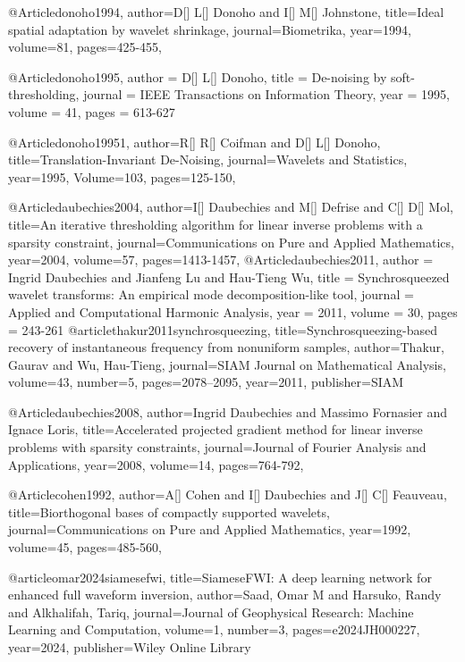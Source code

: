@Article{donoho1994,
  author={D[] L[] Donoho and I[] M[] Johnstone},
  title={Ideal spatial adaptation by wavelet shrinkage},
  journal={Biometrika},
  year=1994,
  volume=81,
  pages={425-455},
}

@Article{donoho1995,
  author =  {D[] L[] Donoho},
  title =   {De-noising by soft-thresholding},
  journal = {IEEE Transactions on Information Theory},
  year =    {1995},
  volume =  {41},
  pages =   {613-627}
}


@Article{donoho19951,
  author={R[] R[] Coifman and D[] L[] Donoho},
  title={Translation-Invariant De-Noising},
  journal={Wavelets and Statistics},
  year=1995,
  Volume=103,
  pages={125-150},
}

@Article{daubechies2004,
  author={I[] Daubechies and M[] Defrise and C[] D[] Mol},
  title={An iterative thresholding algorithm for linear inverse problems with a sparsity constraint},
  journal={Communications on Pure and Applied Mathematics},
  year=2004,
  volume=57,
  pages={1413-1457},
}
@Article{daubechies2011,
  author = 	 {Ingrid Daubechies and Jianfeng Lu and Hau-Tieng Wu},
  title = 	 {Synchrosqueezed wavelet transforms: An empirical mode decomposition-like tool},
  journal = 	 {Applied and Computational Harmonic Analysis},
  year = 	 2011,
  volume = 	 30,
  pages = 	 {243-261}
}
@article{thakur2011synchrosqueezing,
  title={Synchrosqueezing-based recovery of instantaneous frequency from nonuniform samples},
  author={Thakur, Gaurav and Wu, Hau-Tieng},
  journal={SIAM Journal on Mathematical Analysis},
  volume={43},
  number={5},
  pages={2078--2095},
  year={2011},
  publisher={SIAM}
}


@Article{daubechies2008,
  author={Ingrid Daubechies and Massimo Fornasier and Ignace Loris},
  title={Accelerated projected gradient method for linear inverse problems with sparsity constraints},
  journal={Journal of {F}ourier Analysis and Applications},
  year=2008,
  volume=14,
  pages={764-792},
}

@Article{cohen1992,
  author={A[] Cohen and I[] Daubechies and J[] C[] Feauveau},
  title={Biorthogonal bases of compactly supported wavelets},
  journal={Communications on Pure and Applied Mathematics},
  year=1992,
  volume=45,
  pages={485-560},
}

@article{omar2024siamesefwi,
  title={SiameseFWI: A deep learning network for enhanced full waveform inversion},
  author={Saad, Omar M and Harsuko, Randy and Alkhalifah, Tariq},
  journal={Journal of Geophysical Research: Machine Learning and Computation},
  volume={1},
  number={3},
  pages={e2024JH000227},
  year={2024},
  publisher={Wiley Online Library}
}

